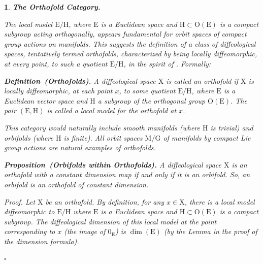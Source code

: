 \documentclass[10pt,reqno,letterpaper,twoside]{amsart}
\theoremstyle{article}
\newtheorem{article}{}
\def\artlabel[#1]{\textbf{#1.}}
\newenvironment{definition}[1]%
{\noindent\textbf{Definition#1.} \it}%
{}
\newenvironment{proposition}[1]%
{\noindent\textbf{Proposition#1.} \it}%
{}
\renewenvironment{proof}%
{\noindent\textit{Proof.}}%
{\nolinebreak\hfill $\square$}
\def \E{\mathrm E}
\def \G{\mathrm G}
\def \H{\mathrm H}
\def \M{\mathrm M}
\def \O{\mathrm O}
\def \X{\mathrm X}
\def \H{\mathrm H} %
\def \O{\mathrm O}
\begin{document}
  
  \begin{article}
    \artlabel[The Orthofold Category]
    \label{The_Orthofold_Category}
    
    The local model $\E/\H$,
    where $\E$ is a Euclidean space and $\H \subset \O(\E)$ is a compact subgroup acting orthogonally,
    appears fundamental for orbit spaces of compact group actions on manifolds.
    This suggests the definition of a class of diffeological spaces,
    tentatively termed \emph{orthofolds},
    characterized by being locally diffeomorphic,
    at every point, to such a quotient $\E/\H$,
    in the spirit of \cite[Section "Modeling Diffeology"]{PIZ13}.
    Formally:
    
    \begin{definition}{~(Orthofolds)}%
      \label{def:orthofold}
      A diffeological space $\X$ is called an \emph{orthofold} if $\X$ is locally diffeomorphic,
      at each point $x$,
      to some quotient $\E/\H$,
      where $\E$ is a Euclidean vector space and $\H$ a subgroup of the orthogonal group $\O(\E)$.
      The pair $(\E, \H)$ is called a \emph{local model} for the orthofold at $x$.
    \end{definition}
    
    This category would naturally include smooth manifolds (where $\H$ is trivial) and orbifolds (where $\H$ is finite).
    All orbit spaces $\M/\G$ of manifolds by compact Lie group actions are natural examples of orthofolds.
    
    \begin{proposition}{~(Orbifolds within Orthofolds)}
      \label{prop:orthofold_vs_orbifold}
      A diffeological space $\X$ is an orthofold with a constant dimension map if and only if it is an orbifold.
      So,
      an orbifold is an orthofold of constant dimension.
    \end{proposition}
    
    \begin{proof}
      Let $\X$ be an orthofold.
      By definition,
      for any $x \in \X$,
      there is a local model diffeomorphic to $\E/\H$ where $\E$ is a Euclidean space and $\H \subset \O(\E)$ is a compact subgroup.
      The diffeological dimension of this local model at the point corresponding to $x$ (the image of $0_\E$) is $\dim(\E)$ (by the Lemma in the proof of the dimension formula).
      

\end{proof}
\end{article}
\end{document}
